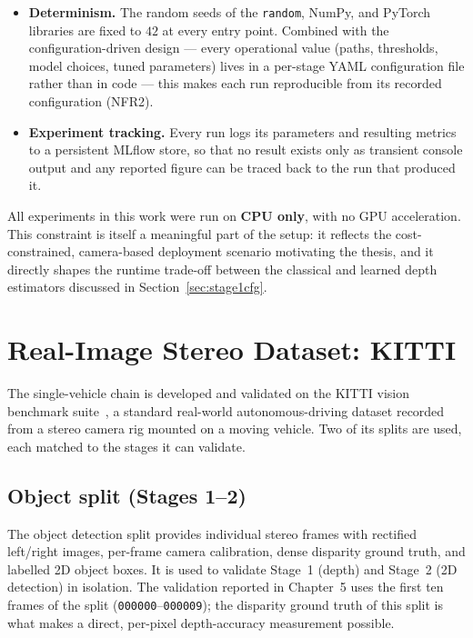 \begin{itemize}[leftmargin=*,itemsep=3pt]
  \item \textbf{Determinism.} The random seeds of the \texttt{random}, NumPy, and
  PyTorch libraries are fixed to $42$ at every entry point. Combined with the
  configuration-driven design --- every operational value (paths, thresholds, model
  choices, tuned parameters) lives in a per-stage YAML configuration file rather
  than in code --- this makes each run reproducible from its recorded configuration
  (NFR2).
  \item \textbf{Experiment tracking.} Every run logs its parameters and resulting
  metrics to a persistent MLflow store, so that no result exists only as transient
  console output and any reported figure can be traced back to the run that produced
  it.
\end{itemize}

All experiments in this work were run on \textbf{CPU only}, with no GPU
acceleration. This constraint is itself a meaningful part of the setup: it reflects
the cost-constrained, camera-based deployment scenario motivating the thesis, and it
directly shapes the runtime trade-off between the classical and learned depth
estimators discussed in Section~\ref{sec:stage1cfg}.

\section{Real-Image Stereo Dataset: KITTI}
\label{sec:kitti}

The single-vehicle chain is developed and validated on the KITTI vision benchmark
suite~\cite{geiger2012kitti}, a standard real-world autonomous-driving dataset
recorded from a stereo camera rig mounted on a moving vehicle. Two of its splits are
used, each matched to the stages it can validate.

\subsection{Object split (Stages 1--2)}

The object detection split provides individual stereo frames with rectified
left/right images, per-frame camera calibration, dense disparity ground truth, and
labelled 2D object boxes. It is used to validate Stage~1 (depth) and Stage~2 (2D
detection) in isolation. The validation reported in Chapter~5 uses the first ten
frames of the split (\texttt{000000}--\texttt{000009}); the disparity ground truth
of this split is what makes a direct, per-pixel depth-accuracy measurement possible.

